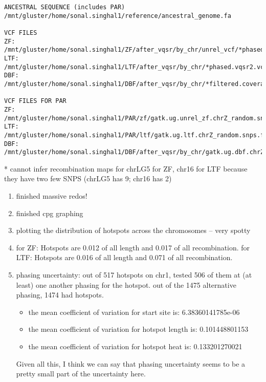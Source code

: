 \documentclass[idxtotoc,hyperref,openany,oneside]{labbook} %
\begin{document}
\begin{enumerate}
\begin{verbatim}
ANCESTRAL SEQUENCE (includes PAR)
/mnt/gluster/home/sonal.singhal1/reference/ancestral_genome.fa

VCF FILES
ZF: /mnt/gluster/home/sonal.singhal1/ZF/after_vqsr/by_chr/unrel_vcf/*phased.vqsr2.vcf.gz
LTF: /mnt/gluster/home/sonal.singhal1/LTF/after_vqsr/by_chr/*phased.vqsr2.vcf.gz
DBF: /mnt/gluster/home/sonal.singhal1/DBF/after_vqsr/by_chr/*filtered.coverage.vqsr.vcf.gz 

VCF FILES FOR PAR
ZF: /mnt/gluster/home/sonal.singhal1/PAR/zf/gatk.ug.unrel_zf.chrZ_random.snps.filtered.vqsr.vcf.gz
LTF: /mnt/gluster/home/sonal.singhal1/PAR/ltf/gatk.ug.ltf.chrZ_random.snps.filtered.vqsr.vcf.gz
DBF: /mnt/gluster/home/sonal.singhal1/DBF/after_vqsr/by_chr/gatk.ug.dbf.chrZ_random.filtered.coverage.vqsr.vcf.gz
\end{verbatim}
* cannot infer recombination maps for chrLG5 for ZF, chr16 for LTF because they have two few SNPS (chrLG5 has 9; chr16 has 2)
\end{enumerate}

\begin{enumerate}
\item finished massive redos!
\item finished cpg graphing
\item plotting the distribution of hotspots across the chromosomes -- very spotty
\item for ZF: Hotspots are 0.012 of all length and 0.017 of all recombination. for LTF: Hotspots are 0.016 of all length and 0.071 of all recombination.
\item phasing uncertainty: out of 517 hotspots on chr1, tested 506 of them at (at least) one another phasing for the hotspot. out of the 1475 alternative phasing, 1474 had hotspots.
\begin{itemize}
\item the mean coefficient of variation for start site is: 6.38360141785e-06
\item the mean coefficient of variation for hotspot length is: 0.101448801153
\item the mean coefficient of variation for hotspot heat is: 0.133201270021
\end{itemize}
Given all this, I think we can say that phasing uncertainty seems to be a pretty small part of the uncertainty here.
\end{enumerate}
\end{document}
